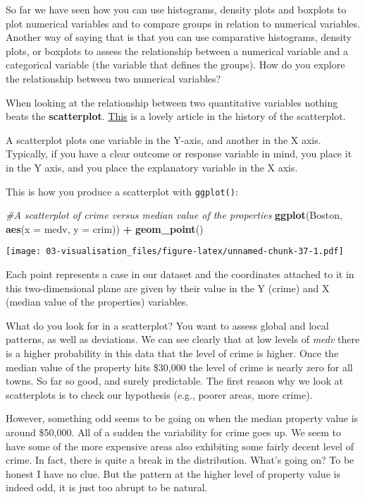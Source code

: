 \documentclass[
]{book}
\newenvironment{Shaded}{\begin{snugshade}}{\end{snugshade}}
\newcommand{\AttributeTok}[1]{\textcolor[rgb]{0.13,0.29,0.53}{#1}}
\newcommand{\CommentTok}[1]{\textcolor[rgb]{0.56,0.35,0.01}{\textit{#1}}}
\newcommand{\FunctionTok}[1]{\textcolor[rgb]{0.13,0.29,0.53}{\textbf{#1}}}
\newcommand{\NormalTok}[1]{#1}
\newcommand{\SpecialCharTok}[1]{\textcolor[rgb]{0.81,0.36,0.00}{\textbf{#1}}}
\begin{document}
So far we have seen how you can use histograms, density plots and boxplots to plot numerical variables and to compare groups in relation to numerical variables. Another way of saying that is that you can use comparative histograms, density plots, or boxplots to assess the relationship between a numerical variable and a categorical variable (the variable that defines the groups). How do you explore the relationship between two numerical variables?

When looking at the relationship between two quantitative variables nothing beats the \textbf{scatterplot}. \href{http://www.datavis.ca/papers/friendly-scat.pdf}{This} is a lovely article in the history of the scatterplot.

A scatterplot plots one variable in the Y-axis, and another in the X axis. Typically, if you have a clear outcome or response variable in mind, you place it in the Y axis, and you place the explanatory variable in the X axis.

This is how you produce a scatterplot with \texttt{ggplot()}:

\begin{Shaded}
\begin{Highlighting}[]
\CommentTok{\#A scatterplot of crime versus median value of the properties}
\FunctionTok{ggplot}\NormalTok{(Boston, }\FunctionTok{aes}\NormalTok{(}\AttributeTok{x =}\NormalTok{ medv, }\AttributeTok{y =}\NormalTok{ crim)) }\SpecialCharTok{+}
  \FunctionTok{geom\_point}\NormalTok{()}
\end{Highlighting}
\end{Shaded}

\texttt{[image: 03-visualisation\_files/figure-latex/unnamed-chunk-37-1.pdf]}

Each point represents a case in our dataset and the coordinates attached to it in this two-dimensional plane are given by their value in the Y (crime) and X (median value of the properties) variables.

What do you look for in a scatterplot? You want to assess global and local patterns, as well as deviations. We can see clearly that at low levels of \emph{medv} there is a higher probability in this data that the level of crime is higher. Once the median value of the property hits \$30,000 the level of crime is nearly zero for all towns. So far so good, and surely predictable. The first reason why we look at scatterplots is to check our hypothesis (e.g., poorer areas, more crime).

However, something odd seems to be going on when the median property value is around \$50,000. All of a sudden the variability for crime goes up. We seem to have some of the more expensive areas also exhibiting some fairly decent level of crime. In fact, there is quite a break in the distribution. What's going on? To be honest I have no clue. But the pattern at the higher level of property value is indeed odd, it is just too abrupt to be natural.
\end{document}
